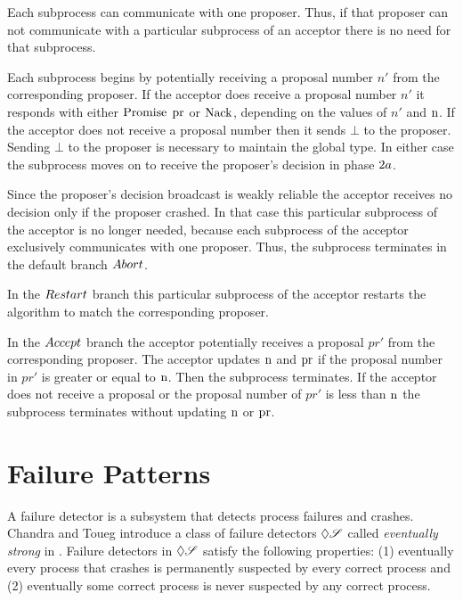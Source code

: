 Each subprocess can communicate with one proposer.
Thus, if that proposer can not communicate with a particular subprocess of an acceptor there is no need for that subprocess.

Each subprocess begins by potentially receiving a proposal number $n'$ from the corresponding proposer.
If the acceptor does receive a proposal number $n'$ it responds with either $\operatorname{Promise}\; \operatorname{pr}$ or $\operatorname{Nack}$, depending on the values of $n'$ and $\operatorname{n}$.
If the acceptor does not receive a proposal number then it sends $\bot$ to the proposer.
Sending $\bot$ to the proposer is necessary to maintain the global type.
In either case the subprocess moves on to receive the proposer's decision in phase $2a$.

Since the proposer's decision broadcast is weakly reliable the acceptor receives no decision only if the proposer crashed.
In that case this particular subprocess of the acceptor is no longer needed, because each subprocess of the acceptor exclusively communicates with one proposer.
Thus, the subprocess terminates in the default branch $\mathnormal{Abort}$.

In the $\mathnormal{Restart}$ branch this particular subprocess of the acceptor restarts the algorithm to match the corresponding proposer.

In the $\mathnormal{Accept}$ branch the acceptor potentially receives a proposal $pr'$ from the corresponding proposer.
The acceptor updates $\operatorname{n}$ and $\operatorname{pr}$ if the proposal number in $pr'$ is greater or equal to $\operatorname{n}$.
Then the subprocess terminates.
If the acceptor does not receive a proposal or the proposal number of $pr'$ is less than $\operatorname{n}$ the subprocess terminates without updating $\operatorname{n}$ or $\operatorname{pr}$.

\section{Failure Patterns}
A failure detector is a subsystem that detects process failures and crashes.
Chandra and Toueg introduce a class of failure detectors $\Diamond\mathscr{S}$ called \emph{eventually strong} in \cite{ChandraToueg96}.
Failure detectors in $\Diamond\mathscr{S}$ satisfy the following properties: (1) eventually every process that crashes is permanently suspected by every correct process and (2) eventually some correct process is never suspected by any correct process.

